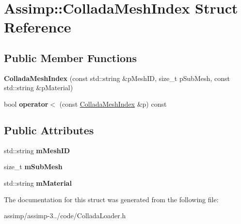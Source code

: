 \hypertarget{struct_assimp_1_1_collada_mesh_index}{\section{Assimp\+:\+:Collada\+Mesh\+Index Struct Reference}
\label{struct_assimp_1_1_collada_mesh_index}
}
\subsection*{Public Member Functions}
\begin{DoxyCompactItemize}
\item 
\hypertarget{struct_assimp_1_1_collada_mesh_index_af0271a892838df283e048812a29aaed4}{{\bfseries Collada\+Mesh\+Index} (const std\+::string \&p\+Mesh\+I\+D, size\+\_\+t p\+Sub\+Mesh, const std\+::string \&p\+Material)}\label{struct_assimp_1_1_collada_mesh_index_af0271a892838df283e048812a29aaed4}

\item 
\hypertarget{struct_assimp_1_1_collada_mesh_index_aad44aaf2bbfb42036cd4521e095457f6}{bool {\bfseries operator$<$} (const \hyperlink{struct_assimp_1_1_collada_mesh_index}{Collada\+Mesh\+Index} \&p) const }\label{struct_assimp_1_1_collada_mesh_index_aad44aaf2bbfb42036cd4521e095457f6}

\end{DoxyCompactItemize}
\subsection*{Public Attributes}
\begin{DoxyCompactItemize}
\item 
\hypertarget{struct_assimp_1_1_collada_mesh_index_a3da29bafca7b4dea02973009d27aa43d}{std\+::string {\bfseries m\+Mesh\+I\+D}}\label{struct_assimp_1_1_collada_mesh_index_a3da29bafca7b4dea02973009d27aa43d}

\item 
\hypertarget{struct_assimp_1_1_collada_mesh_index_a372bf7ae52340255cd4b61a95ac26316}{size\+\_\+t {\bfseries m\+Sub\+Mesh}}\label{struct_assimp_1_1_collada_mesh_index_a372bf7ae52340255cd4b61a95ac26316}

\item 
\hypertarget{struct_assimp_1_1_collada_mesh_index_a69975d44b7dc4700a0c4436550706772}{std\+::string {\bfseries m\+Material}}\label{struct_assimp_1_1_collada_mesh_index_a69975d44b7dc4700a0c4436550706772}

\end{DoxyCompactItemize}


The documentation for this struct was generated from the following file\+:\begin{DoxyCompactItemize}
\item 
assimp/assimp-\/3../code/Collada\+Loader.\+h\end{DoxyCompactItemize}
